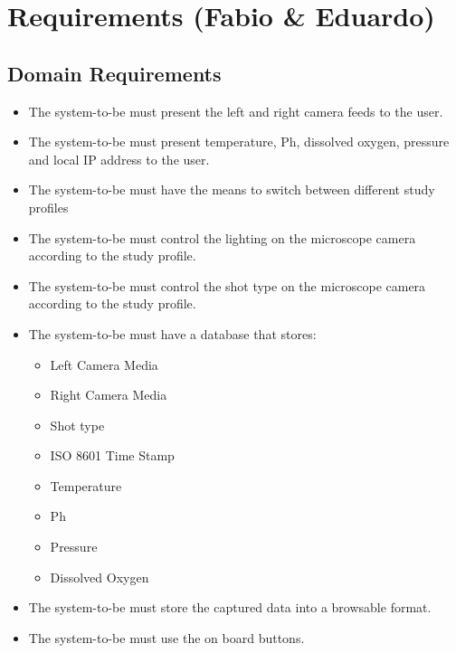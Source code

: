 \section{Requirements (Fabio \& Eduardo)}
\subsection{Domain Requirements}
\begin{itemize}
	\item The system-to-be must present the left and right camera feeds to the user.
	\item The system-to-be must present temperature, Ph, dissolved oxygen, pressure and local IP address to the user.
	\item The system-to-be must have the means to switch between different study profiles
        \item The system-to-be must control the lighting on the microscope camera according to the study profile.
        \item The system-to-be must control the shot type on the microscope camera according to the study profile.
	\item The system-to-be must have a database that stores:
	      \begin{itemize}
		      \item Left Camera Media
		      \item Right Camera Media
		      \item Shot type
		      \item ISO 8601 Time Stamp
		      \item Temperature
		      \item Ph
		      \item Pressure
		      \item Dissolved Oxygen
	      \end{itemize}
	\item The system-to-be must store the captured data into a browsable format.
	\item The system-to-be must use the on board buttons.
\end{itemize}
